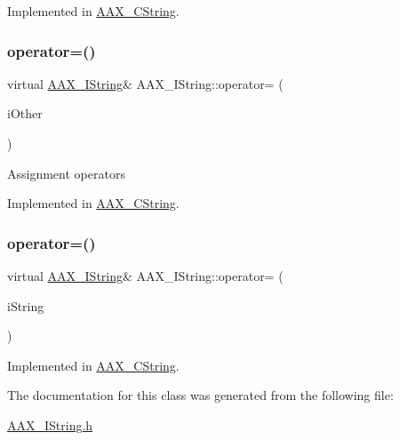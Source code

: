 Implemented in \mbox{\hyperlink{a01573_afceddbfd8955a6aa9d127c03bf488cbc}{A\+A\+X\+\_\+\+C\+String}}.

\mbox{\label{a01873_aaaf335636d64612714ffa93859d1a39c}} 
\subsubsection{\texorpdfstring{operator=()}{operator=()}\hspace{0.1cm}{\footnotesize\ttfamily [1/2]}}
{\footnotesize\ttfamily virtual \mbox{\hyperlink{a01873}{A\+A\+X\+\_\+\+I\+String}}\& A\+A\+X\+\_\+\+I\+String\+::operator= (\begin{DoxyParamCaption}\item[{const \mbox{\hyperlink{a01873}{A\+A\+X\+\_\+\+I\+String}} \&}]{i\+Other }\end{DoxyParamCaption})\hspace{0.3cm}{\ttfamily [pure virtual]}}

Assignment operators 

Implemented in \mbox{\hyperlink{a01573_abc8ccb77fbd70435016d4d90588bc02e}{A\+A\+X\+\_\+\+C\+String}}.

\mbox{\label{a01873_abccb4049e229d265fdb8635342add574}} 
\subsubsection{\texorpdfstring{operator=()}{operator=()}\hspace{0.1cm}{\footnotesize\ttfamily [2/2]}}
{\footnotesize\ttfamily virtual \mbox{\hyperlink{a01873}{A\+A\+X\+\_\+\+I\+String}}\& A\+A\+X\+\_\+\+I\+String\+::operator= (\begin{DoxyParamCaption}\item[{const char $\ast$}]{i\+String }\end{DoxyParamCaption})\hspace{0.3cm}{\ttfamily [pure virtual]}}



Implemented in \mbox{\hyperlink{a01573_a6970684024d6e230342a79057417de9b}{A\+A\+X\+\_\+\+C\+String}}.



The documentation for this class was generated from the following file\+:\begin{DoxyCompactItemize}
\item 
\mbox{\hyperlink{a00635}{A\+A\+X\+\_\+\+I\+String.\+h}}\end{DoxyCompactItemize}
